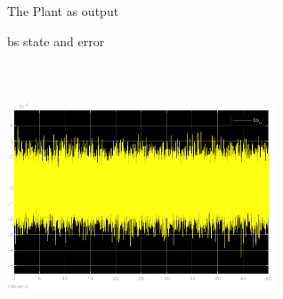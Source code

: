 \documentclass[12pt, a4paper]{article}
\begin{document}
\begin{enumerate}[1.]
\begin{figure}[H]
    \caption{The Plant as output}
    \label{fig:label}
    \end{figure}
\begin{figure}[H]
        \centering
        \qquad
        \caption{bs state and error}
        \label{fig:example}%
    \end{figure}
\begin{figure}[H]
    \centering
    \includegraphics[width=8cm,height=8cm,scale=0.6]{bs_o.png}

\end{figure}
\end{enumerate}
\end{document}
